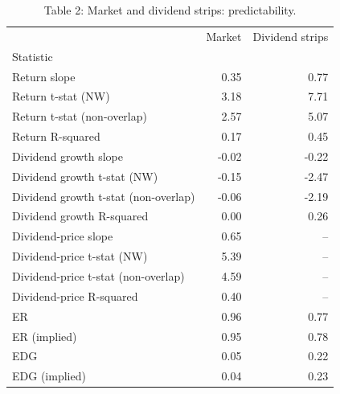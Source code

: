 \begin{table}
\caption{Table 2: Market and dividend strips: predictability.}
\label{tab:replication_2}
\begin{tabular}{lrr}
\toprule
 & Market & Dividend strips \\
Statistic &  &  \\
\midrule
Return slope & 0.35 & 0.77 \\
Return t-stat (NW) & 3.18 & 7.71 \\
Return t-stat (non-overlap) & 2.57 & 5.07 \\
Return R-squared & 0.17 & 0.45 \\
Dividend growth slope & -0.02 & -0.22 \\
Dividend growth t-stat (NW) & -0.15 & -2.47 \\
Dividend growth t-stat (non-overlap) & -0.06 & -2.19 \\
Dividend growth R-squared & 0.00 & 0.26 \\
Dividend-price slope & 0.65 & -- \\
Dividend-price t-stat (NW) & 5.39 & -- \\
Dividend-price t-stat (non-overlap) & 4.59 & -- \\
Dividend-price R-squared & 0.40 & -- \\
ER & 0.96 & 0.77 \\
ER (implied) & 0.95 & 0.78 \\
EDG & 0.05 & 0.22 \\
EDG (implied) & 0.04 & 0.23 \\
\bottomrule
\end{tabular}
\end{table}
